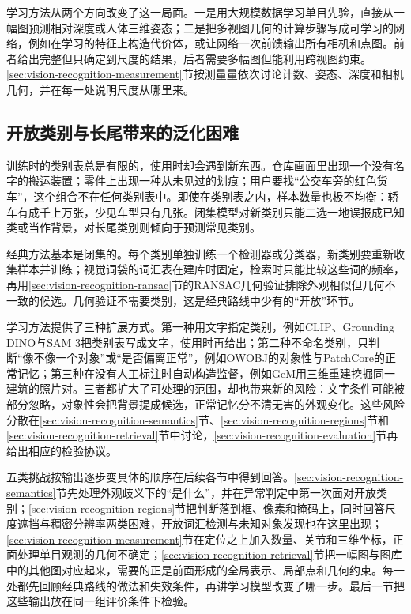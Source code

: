 学习方法从两个方向改变了这一局面。一是用大规模数据学习单目先验，直接从一幅图预测相对深度或人体三维姿态；二是把多视图几何的计算步骤写成可学习的网络，例如在学习的特征上构造代价体，或让网络一次前馈输出所有相机和点图。前者给出完整但只确定到尺度的结果，后者需要多幅图但能利用跨视图约束。\ref{sec:vision-recognition-measurement}节按测量量依次讨论计数、姿态、深度和相机几何，并在每一处说明尺度从哪里来。

\subsection{开放类别与长尾带来的泛化困难}
\label{sec:vision-recognition-challenge-open}

训练时的类别表总是有限的，使用时却会遇到新东西。仓库画面里出现一个没有名字的搬运装置；零件上出现一种从未见过的划痕；用户要找“公交车旁的红色货车”，这个组合不在任何类别表中。即使在类别表之内，样本数量也极不均衡：轿车有成千上万张，少见车型只有几张。闭集模型对新类别只能二选一地误报成已知类或当作背景，对长尾类别则倾向于预测常见类别。

经典方法基本是闭集的。每个类别单独训练一个检测器或分类器，新类别要重新收集样本并训练；视觉词袋的词汇表在建库时固定，检索时只能比较这些词的频率，再用\ref{sec:vision-recognition-ransac}节的RANSAC几何验证排除外观相似但几何不一致的候选。几何验证不需要类别，这是经典路线中少有的“开放”环节。

学习方法提供了三种扩展方式。第一种用文字指定类别，例如CLIP、Grounding DINO与SAM 3把类别表写成文字，使用时再给出；第二种不命名类别，只判断“像不像一个对象”或“是否偏离正常”，例如OWOBJ的对象性与PatchCore的正常记忆；第三种在没有人工标注时自动构造监督，例如GeM用三维重建挖掘同一建筑的照片对。三者都扩大了可处理的范围，却也带来新的风险：文字条件可能被部分忽略，对象性会把背景提成候选，正常记忆分不清无害的外观变化。这些风险分散在\ref{sec:vision-recognition-semantics}节、\ref{sec:vision-recognition-regions}节和\ref{sec:vision-recognition-retrieval}节中讨论，\ref{sec:vision-recognition-evaluation}节再给出相应的检验协议。

五类挑战按输出逐步变具体的顺序在后续各节中得到回答。\ref{sec:vision-recognition-semantics}节先处理外观歧义下的“是什么”，并在异常判定中第一次面对开放类别；\ref{sec:vision-recognition-regions}节把判断落到框、像素和掩码上，同时回答尺度遮挡与稠密分辨率两类困难，开放词汇检测与未知对象发现也在这里出现；\ref{sec:vision-recognition-measurement}节在定位之上加入数量、关节和三维坐标，正面处理单目观测的几何不确定；\ref{sec:vision-recognition-retrieval}节把一幅图与图库中的其他图对应起来，需要的正是前面形成的全局表示、局部点和几何约束。每一处都先回顾经典路线的做法和失效条件，再讲学习模型改变了哪一步。最后一节把这些输出放在同一组评价条件下检验。

